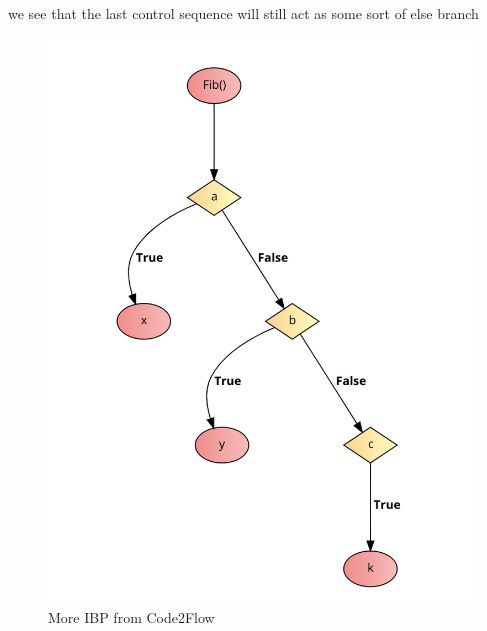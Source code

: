 we see that the last control sequence will still act as some sort of else branch

\begin{figure}[ht]
    \centering
    \includegraphics[scale=0.45]{assets/weirdFlochartC2F2.png}
    \caption{More IBP from Code2Flow}
    \label{fig:c2f_weird2}
\end{figure}